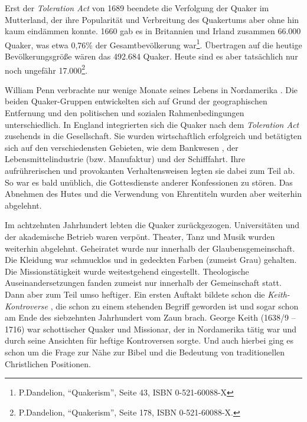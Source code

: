 \medskip

Erst der \textit{Toleration Act}  von 1689 beendete die
Verfolgung der Quaker im
Mutterland, der ihre Popularität und Verbreitung des Quakertums aber ohne hin
kaum eindämmen konnte.
  1660 gab
es in Britannien  und Irland 
zusammen
66.000 Quaker, was etwa 0,76\% der
Gesamtbevölkerung war\footnote{P.Dandelion, "`Quakerism"', Seite 43, ISBN
0-521-60088-X}. Übertragen auf die heutige Bevölkerungsgröße wären das 492.684
Quaker. Heute sind es aber tatsächlich nur noch ungefähr
17.000\footnote{P.Dandelion, "`Quakerism"', Seite 178, ISBN 0-521-60088-X.}.

\medskip

William Penn verbrachte nur wenige Monate seines Lebens in Nordamerika
. Die beiden
Quaker-Gruppen entwickelten sich auf Grund der geographischen Entfernung und den
politischen und sozialen Rahmenbedingungen unterschiedlich. In
England integrierten sich die Quaker nach dem \textit{Toleration Act} zusehends
in die Gesellschaft. Sie wurden  wirtschaftlich
erfolgreich und betätigten sich
auf den verschiedensten Gebieten, wie dem Bankwesen , der
Lebensmittelindustrie 
(bzw. Manufaktur) und der Schifffahrt. Ihre aufrührerischen und provokanten
Verhaltensweisen legten sie dabei zum Teil ab. So war es bald unüblich, die
Gottesdienste  anderer Konfessionen
 zu stören. Das Abnehmen des Hutes und die
Verwendung von Ehrentiteln wurden aber weiterhin abgelehnt.

\medskip

Im achtzehnten Jahrhundert lebten die Quaker zurückgezogen.
Universitäten  und der akademische Betrieb waren verpönt.
 Theater, Tanz  und Musik 
wurden weiterhin abgelehnt. Geheiratet  wurde nur innerhalb der
Glaubensgemeinschaft. Die Kleidung  war schmucklos und in
gedeckten Farben
(zumeist Grau) gehalten. Die Missionstätigkeit wurde weitestgehend eingestellt.
Theologische Auseinandersetzungen fanden zumeist nur innerhalb der Gemeinschaft
statt. Dann aber zum Teil umso heftiger. Ein ersten Auftakt bildete schon die
\textit{Keith-Kontroverse} , die schon zu einem
stehenden Begriff geworden ist und sogar schon am Ende des siebzehnten Jahrhundert
vom Zaun brach. George Keith (1638/9 -- 1716) 
war schottischer
Quaker und Missionar, der in
Nordamerika tätig war und durch seine Ansichten für heftige Kontroversen
sorgte. Und auch hierbei ging es schon um die Frage zur Nähe zur Bibel und die
Bedeutung von traditionellen Christlichen Positionen.

